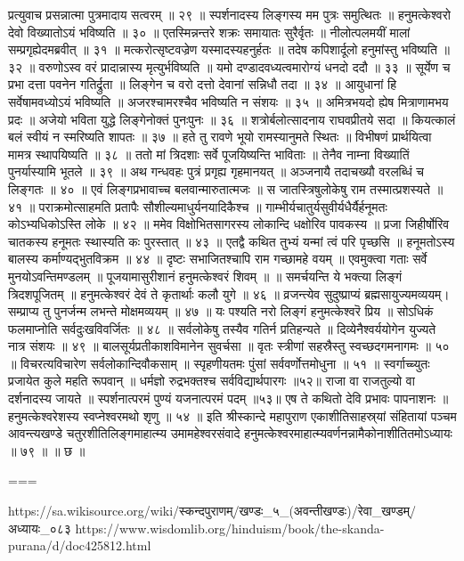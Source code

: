 प्रत्युवाच प्रसन्नात्मा पुत्रमादाय सत्वरम् ॥ २९ ॥
स्पर्शनादस्य लिङ्गस्य मम पुत्रः समुत्थितः ॥
हनुमत्केश्वरो देवो विख्यातोऽयं भविष्यति ॥ ३० ॥
एतस्मिन्नन्तरे शक्रः समायातः सुरैर्वृतः ॥
नीलोत्पलमयीं मालां सम्प्रगृह्येदमब्रवीत् ॥ ३१ ॥
मत्करोत्सृष्टवज्रेण यस्मादस्यहनुर्हतः ॥
तदेष कपिशार्दूलो हनुमांस्तु भविष्यति ॥ ३२ ॥
वरुणोऽस्व वरं प्रादान्नास्य मृत्युर्भविष्यति ॥
यमो दण्डादवध्यत्वमारोग्यं धनदो ददौ ॥ ३३ ॥
सूर्येण च प्रभा दत्ता पवनेन गतिर्द्रुता ॥
लिङ्गेन च वरो दत्तो देवानां सन्निधौ तदा ॥ ३४ ॥
आयुधानां हि सर्वेषामवध्योऽयं भविष्यति ॥
अजरश्चामरश्चैव भविष्यति न संशयः ॥ ३५ ॥
अमित्रभयदो ह्येष मित्राणामभय प्रदः ॥
अजेयो भविता युद्धे लिङ्गेनोक्तं पुनःपुनः ॥ ३६ ॥
शत्रोर्बलोत्सादनाय राघवप्रीतये सदा ॥
कियत्कालं बलं स्वीयं न स्मरिष्यति शापतः ॥ ३७ ॥
हते तु रावणे भूयो रामस्यानुमते स्थितः ॥
विभीषणं प्रार्थयित्वा मामत्र स्थापयिष्यति ॥ ३८ ॥
ततो मां त्रिदशाः सर्वे पूजयिष्यन्ति भाविताः ॥
तेनैव नाम्ना विख्यातिं पुनर्यास्यामि भूतले ॥ ३९ ॥
अथ गन्धवहः पुत्रं प्रगृह्य गृहमानयत् ॥
अञ्जनायै तदाचख्यौ वरलब्धिं च लिङ्गतः ॥ ४० ॥
एवं लिङ्गप्रभावाच्च बलवान्मारुतात्मजः ॥
स जातस्त्रिषुलोकेषु राम तस्मात्प्रशस्यते ॥ ४१ ॥
पराक्रमोत्साहमति प्रतापैः सौशील्यमाधुर्यनयादिकैश्च ॥
गाम्भीर्यचातुर्यसुवीर्यधैर्यैर्हनूमतः कोऽभ्यधिकोऽस्ति लोके ॥ ४२ ॥
ममेव विक्षोभितसागरस्य लोकान्दि धक्षोरिव पावकस्य ॥
प्रजा जिहीर्षोरिव चातकस्य हनूमतः स्थास्यति कः पुरस्तात् ॥ ४३ ॥
एतद्वै कथित तुभ्यं यन्मां त्वं परि पृच्छसि ॥
हनूमतोऽस्य बालस्य कर्माण्यद्भुतविक्रम ॥ ४४ ॥
दृष्टः सभाजितश्चापि राम गच्छामहे वयम् ॥
एवमुक्त्वा गताः सर्वे मुनयोऽवन्तिमण्डलम् ॥
पूजयामासुरीशानं हनुमत्केश्वरं शिवम् ॥ ॥
समर्चयन्ति ये भक्त्या लिङ्गं त्रिदशपूजितम् ॥
हनुमत्केश्वरं देवं ते कृतार्थाः कलौ युगे ॥ ४६ ॥
व्रजन्त्येव सुदुष्प्राप्यं ब्रह्मसायुज्यमव्ययम्।
सम्प्राप्य तु पुनर्जन्म लभन्ते मोक्षमव्ययम् ॥ ४७ ॥
यः पश्यति नरो लिङ्गं हनुमत्केश्वरॆ प्रिय ॥
सोऽधिकं फलमाप्नोति सर्वदुःखविवर्जितः ॥ ४८ ॥
सर्वलोकेषु तस्यैव गतिर्न प्रतिहन्यते ॥
दिव्येनैश्वर्ययोगेन युज्यते नात्र संशयः ॥ ४९ ॥
बालसूर्यप्रतीकाशविमानेन सुवर्चसा ॥
वृतः स्त्रीणां सहस्रैस्तु स्वच्छदगमनागमः ॥ ५० ॥
विचरत्यविचारेण सर्वलोकान्दिवौकसाम् ॥
स्पृहणीयतमः पुंसां सर्ववर्णोत्तमोधुना ॥ ५१ ॥
स्वर्गाच्च्युतः प्रजायेत कुले महति रूपवान् ॥
धर्मज्ञो रुद्रभक्तश्च सर्वविद्यार्थपारगः ॥५२॥
राजा वा राजतुल्यो वा दर्शनादस्य जायते ॥
स्पर्शनात्परमं पुण्यं यजनात्परमं पदम् ॥५३॥
एष ते कथितो देवि प्रभावः पापनाशनः ॥
हनुमत्केश्वरेशस्य स्वप्नेश्वरमथो शृणु ॥ ५४ ॥
इति श्रीस्कान्दे महापुराण एकाशीतिसाहस्र्यां संहितायां पञ्चम आवन्त्यखण्डे चतुरशीतिलिङ्गमाहात्म्य उमामहेश्वरसंवादे हनुमत्केश्वरमाहात्म्यवर्णनन्नामैकोनाशीतितमोऽध्यायः ॥ ७९ ॥ ॥ छ ॥

===

https://sa.wikisource.org/wiki/स्कन्दपुराणम्/खण्डः_५_(अवन्तीखण्डः)/रेवा_खण्डम्/अध्यायः_०८३
https://www.wisdomlib.org/hinduism/book/the-skanda-purana/d/doc425812.html

